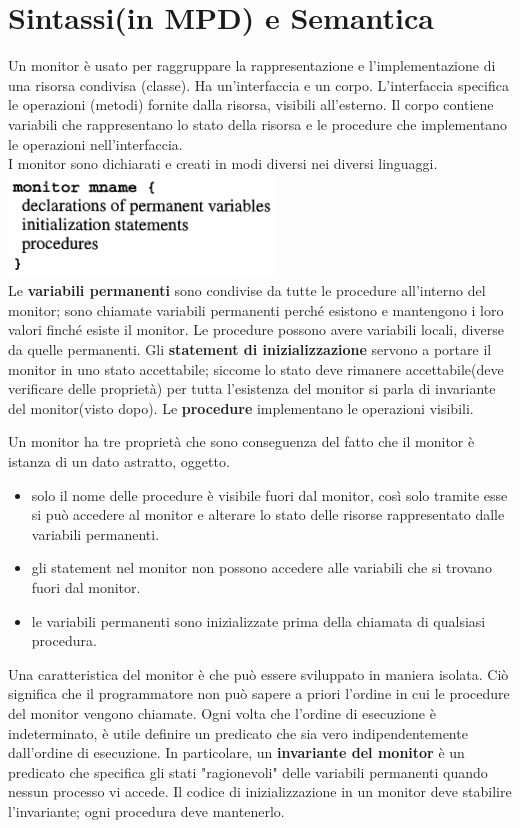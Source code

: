 \documentclass[10pt,a4paper]{book}
\begin{document}
\section{Sintassi(in MPD) e Semantica}
Un monitor è usato per raggruppare la rappresentazione e l'implementazione di una risorsa condivisa (classe). Ha un'interfaccia e un corpo. L'interfaccia specifica le operazioni (metodi) fornite dalla risorsa, visibili all'esterno. Il corpo contiene variabili che rappresentano lo stato della risorsa e le procedure che implementano le operazioni nell'interfaccia.\\
I monitor sono dichiarati e creati in modi diversi nei diversi linguaggi. \\
\includegraphics[scale=0.51]{img/monitor.png} \\
Le \textbf{variabili permanenti} sono condivise da tutte le procedure all'interno del monitor; sono chiamate variabili permanenti perché esistono e mantengono i loro valori finché esiste il monitor. Le procedure possono avere variabili locali, diverse da quelle permanenti.
Gli \textbf{statement di inizializzazione} servono a portare il monitor in uno stato accettabile; siccome lo stato deve rimanere accettabile(deve verificare delle proprietà) per tutta l'esistenza del monitor si parla di invariante del monitor(visto dopo).
Le \textbf{procedure} implementano le operazioni visibili.

Un monitor ha tre proprietà che sono conseguenza del fatto che il monitor è istanza di un dato astratto, oggetto.
\begin{itemize}
\item solo il nome delle procedure è visibile fuori dal monitor, così solo tramite esse si può accedere al monitor e alterare lo stato delle risorse rappresentato dalle variabili permanenti.
\item gli statement nel monitor non possono accedere alle variabili che si trovano fuori dal monitor.
\item le variabili permanenti sono inizializzate prima della chiamata di qualsiasi procedura.
\end{itemize}

Una caratteristica del monitor è che può essere sviluppato in maniera isolata. Ciò significa che il programmatore non può sapere a priori l'ordine in cui le procedure del monitor vengono chiamate. Ogni volta che l'ordine di esecuzione è indeterminato, è utile definire un predicato che sia vero indipendentemente dall'ordine di esecuzione. In particolare, un \textbf{invariante del monitor} è un predicato che specifica gli stati "ragionevoli" delle variabili permanenti quando nessun processo vi accede. Il codice di inizializzazione in un monitor deve stabilire l'invariante; ogni procedura deve mantenerlo.
\end{document}
